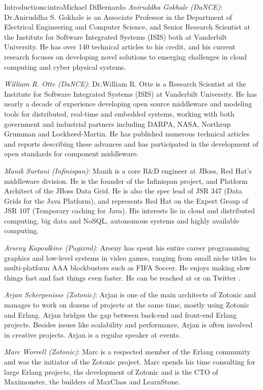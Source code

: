 \begin{aosachapter}{Introduction}{s:intro}{Michael DiBernardo}
\emph{Aniruddha Gokhale (DaNCE)}: Dr.\@ Aniruddha S. Gokhale is an Associate Professor in the Department of Electrical Engineering and Computer Science, and Senior Research Scientist at the Institute for Software Integrated Systems (ISIS) both at Vanderbilt University. He has over 140 technical articles to his credit, and his current research focuses on developing novel solutions to emerging challenges in cloud computing and cyber physical systems.

\emph{William R. Otte (DaNCE)}: Dr.\@ William R. Otte is a Research Scientist at the Institute for Software Integrated Systems (ISIS) at Vanderbilt University.  He has nearly a decade of experience developing open source middleware and modeling tools for distributed, real-time and embedded systems, working with both government and industrial partners including DARPA, NASA, Northrup Grumman and Lockheed-Martin. He has published numerous technical articles and reports describing these advances and has participated in the development of open standards for component middleware.

\emph{Manik Surtani (Infinispan)}: Manik is a core R\&D engineer at JBoss, Red Hat's middleware division. He is the founder of the Infinispan project, and Platform Architect of the JBoss Data Grid. He is also the spec lead of JSR 347 (Data Grids for the Java Platform), and represents Red Hat on the Expert Group of JSR 107 (Temporary caching for Java). His interests lie in cloud and distributed computing, big data and NoSQL, autonomous systems and highly available computing. 

\emph{Arseny Kapoulkine (Pugixml)}: Arseny has spent his entire career programming graphics and low-level systems in video games, ranging from small niche titles to multi-platform AAA blockbusters such as FIFA Soccer. He enjoys making slow things fast and fast things even faster. He can be reached at  or on Twitter .

\emph{Arjan Scherpenisse (Zotonic)}: Arjan is one of the main architects of Zotonic and manages to work on dozens of projects at the same time, mostly using Zotonic and Erlang. Arjan bridges the gap between back-end and front-end Erlang projects. Besides issues like scalability and performance, Arjan  is often involved in creative projects. Arjan is a regular speaker at events.

\emph{Marc Worrell (Zotonic)}: Marc is a respected member of the Erlang community and was the initiator of the Zotonic project. Marc spends his time consulting for large Erlang projects, the development of Zotonic and is the CTO of Maximonster, the builders of MaxClass and LearnStone.


\end{aosachapter}
